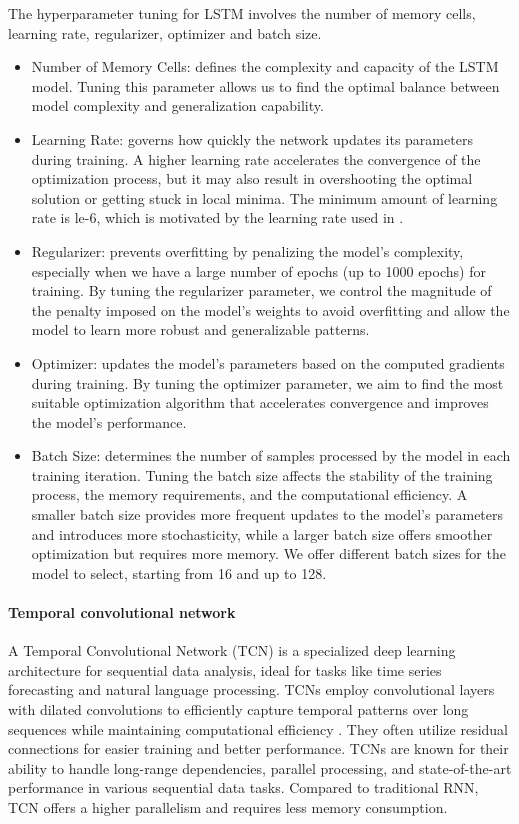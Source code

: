 \documentclass{article}
\begin{document}
The hyperparameter tuning for LSTM involves the number of memory cells, learning rate, regularizer, optimizer and batch size. 
\begin{itemize}
  \item Number of Memory Cells: defines the complexity and capacity of the LSTM model. Tuning this parameter allows us to find the optimal balance between model complexity and generalization capability. 
  \item Learning Rate: governs how quickly the network updates its parameters during training. A higher learning rate accelerates the convergence of the optimization process, but it may also result in overshooting the optimal solution or getting stuck in local minima. The minimum amount of learning rate is le-6, which is motivated by the learning rate used in \cite{krauss2017deep}.
  \item Regularizer: prevents overfitting by penalizing the model's complexity, especially when we have a large number of epochs (up to 1000 epochs) for training. By tuning the regularizer parameter, we control the magnitude of the penalty imposed on the model's weights to avoid overfitting and allow the model to learn more robust and generalizable patterns.
  \item Optimizer: updates the model's parameters based on the computed gradients during training. By tuning the optimizer parameter, we aim to find the most suitable optimization algorithm that accelerates convergence and improves the model's performance.
  \item Batch Size: determines the number of samples processed by the model in each training iteration. Tuning the batch size affects the stability of the training process, the memory requirements, and the computational efficiency. A smaller batch size provides more frequent updates to the model's parameters and introduces more stochasticity, while a larger batch size offers smoother optimization but requires more memory. We offer different batch sizes for the model to select, starting from 16 and up to 128. 
\end{itemize}


\paragraph{Temporal convolutional network}
A Temporal Convolutional Network (TCN) is a specialized deep learning architecture for sequential data analysis, ideal for tasks like time series forecasting and natural language processing. TCNs employ convolutional layers with dilated convolutions to efficiently capture temporal patterns over long sequences while maintaining computational efficiency \citep{bai2018empirical}. They often utilize residual connections for easier training and better performance. TCNs are known for their ability to handle long-range dependencies, parallel processing, and state-of-the-art performance in various sequential data tasks. Compared to traditional RNN, TCN offers a higher parallelism and requires less memory consumption. 
\end{document}
